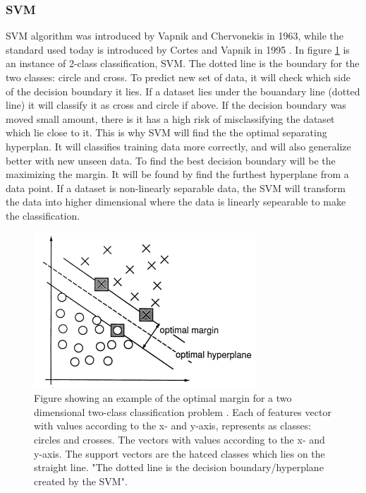 \documentclass[USenglish]{ifimaster}  %
\begin{document}
\subsubsection{SVM}
SVM algorithm was introduced by Vapnik and Chervonekis in 1963, while the standard used today is introduced by Cortes and Vapnik in 1995 \cite{Cortes1995}. In figure \ref{fig:SVM} is an instance of 2-class classification, SVM. The dotted line is the boundary for the two classes: circle and cross. To predict new set of data, it will check which side of the decision boundary it lies. If a dataset lies under the bouandary line (dotted line) it will classify it as cross and circle if above. If the decision boundary was moved small amount, there is it has a high risk of misclassifying the dataset which lie close to it. This is why SVM will find the the optimal separating hyperplan. It will classifies training data more correctly, and will also generalize better with new unseen data. To find the best decision boundary will be the maximizing the margin. It will be found by find the furthest hyperplane from a data point. If a dataset is non-linearly separable data, the SVM will transform the data into higher dimensional where the data is linearly sepearable to make the classification.


\begin{figure}[h]
    \centering
    \includegraphics{Figures/SVM.PNG}
    \caption{Figure showing an example of the optimal margin for a two dimensional
two-class classification problem \cite{Cortes1995}. Each of features vector with values according to the x- and y-axis, represents as classes: circles and crosses. The 
vectors with values according to the x- and y-axis. The support vectors are the hatced classes which lies on the straight line. "The dotted line is the decision boundary/hyperplane created by the SVM".}
    \label{fig:SVM}
\end{figure}
\end{document}
